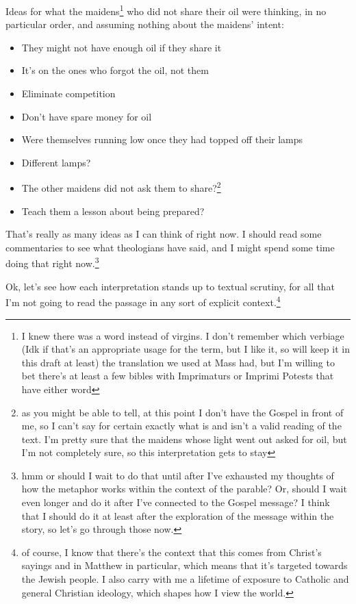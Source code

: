 \documentclass[12pt]{article}[titlepage]
\newcommand{\1}{\={a}}
\newcommand{\2}{\={e}}
\newcommand{\3}{\={\i}}
\newcommand{\4}{\=o}
\newcommand{\5}{\=u}
\newcommand{\6}{\={A}}
\renewcommand{\,}{\textsuperscript{,}}
\begin{document}
Ideas for what the maidens\footnote{I knew there was a word instead of virgins. I don't remember which verbiage (Idk if that's an appropriate usage for the term, but I like it, so will keep it in this draft at least) the translation we used at Mass had, but I'm willing to bet there's at least a few bibles with Imprimaturs or Imprimi Potests that have either word} who did not share their oil were thinking, in no particular order, and assuming nothing about the maidens' intent:
\begin{itemize}
\item They might not have enough oil if they share it
\item It's on the ones who forgot the oil, not them
\item Eliminate competition
\item Don't have spare money for oil
\item Were themselves running low once they had topped off their lamps
\item Different lamps?
\item The other maidens did not ask them to share?\footnote{as you might be able to tell, at this point I don't have the Gospel in front of me, so I can't say for certain exactly what is and isn't a valid reading of the text.
I'm pretty sure that the maidens whose light went out asked for oil, but I'm not completely sure, so this interpretation gets to stay}
\item Teach them a lesson about being prepared?
\end{itemize}

That's really as many ideas as I can think of right now.
I should read some commentaries to see what theologians have said, and I might spend some time doing that right now.\footnote{hmm or should I wait to do that until after I've exhausted my thoughts of how the metaphor works within the context of the parable?
Or, should I wait even longer and do it after I've connected to the Gospel message?
I think that I should do it at least after the exploration of the message within the story, so let's go through those now.}

Ok, let's see how each interpretation stands up to textual scrutiny, for all that I'm not going to read the passage in any sort of explicit context.\footnote{of course, I know that there's the context that this comes from Christ's sayings and in Matthew in particular, which means that it's targeted towards the Jewish people.
I also carry with me a lifetime of exposure to Catholic and general Christian ideology, which shapes how I view the world.}
\end{document}
